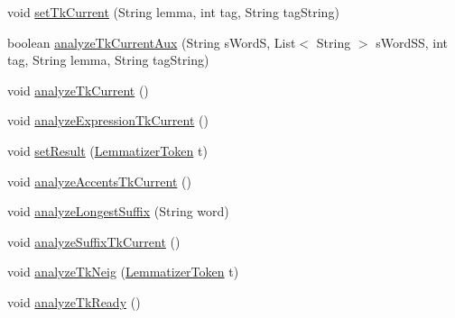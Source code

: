\begin{DoxyCompactItemize}
\item 
void \hyperlink{classbr_1_1usp_1_1cata_1_1util_1_1lemmatizer_1_1_lemmatizer_a4e8b806057732f8da5b11091998389a1}{set\+Tk\+Current} (String lemma, int tag, String tag\+String)
\item 
boolean \hyperlink{classbr_1_1usp_1_1cata_1_1util_1_1lemmatizer_1_1_lemmatizer_af7b22d7b43327af54c4012a2498f43fb}{analyze\+Tk\+Current\+Aux} (String s\+Word\+S, List$<$ String $>$ s\+Word\+S\+S, int tag, String lemma, String tag\+String)
\item 
void \hyperlink{classbr_1_1usp_1_1cata_1_1util_1_1lemmatizer_1_1_lemmatizer_a343c31a931af7e29471c2711ab6f0d73}{analyze\+Tk\+Current} ()
\item 
void \hyperlink{classbr_1_1usp_1_1cata_1_1util_1_1lemmatizer_1_1_lemmatizer_a9619a90003cd6c2d1425d8ea45ccde5b}{analyze\+Expression\+Tk\+Current} ()
\item 
void \hyperlink{classbr_1_1usp_1_1cata_1_1util_1_1lemmatizer_1_1_lemmatizer_aea04b7a92d9c1840cd2e73a835ccf5ac}{set\+Result} (\hyperlink{classbr_1_1usp_1_1cata_1_1util_1_1lemmatizer_1_1_lemmatizer_token}{Lemmatizer\+Token} t)
\item 
void \hyperlink{classbr_1_1usp_1_1cata_1_1util_1_1lemmatizer_1_1_lemmatizer_a21ffdaf4b15495e387fdf9b6f8d878b7}{analyze\+Accents\+Tk\+Current} ()
\item 
void \hyperlink{classbr_1_1usp_1_1cata_1_1util_1_1lemmatizer_1_1_lemmatizer_a94e0438b600019b49ce33b5503cba14b}{analyze\+Longest\+Suffix} (String word)
\item 
void \hyperlink{classbr_1_1usp_1_1cata_1_1util_1_1lemmatizer_1_1_lemmatizer_af45798341636cbed42c8749da742ea9d}{analyze\+Suffix\+Tk\+Current} ()
\item 
void \hyperlink{classbr_1_1usp_1_1cata_1_1util_1_1lemmatizer_1_1_lemmatizer_a3b60e11a1def8a57fbe549eabebcfbf8}{analyze\+Tk\+Neig} (\hyperlink{classbr_1_1usp_1_1cata_1_1util_1_1lemmatizer_1_1_lemmatizer_token}{Lemmatizer\+Token} t)
\item 
void \hyperlink{classbr_1_1usp_1_1cata_1_1util_1_1lemmatizer_1_1_lemmatizer_acfa5b47182e5a388a236e384adccdf2d}{analyze\+Tk\+Ready} ()
\end{DoxyCompactItemize}

